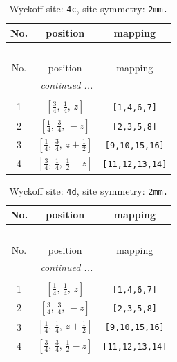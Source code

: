 \documentclass[fleqn,8pt]{jsarticle}
\begin{document}
\renewcommand{\arraystretch}{1.2}
\begin{longtable}{ccc}
\caption{Wyckoff site: {\tt 4c}, site symmetry: {\tt 2mm.}}
 \\
 \hline \hline
No. & position & mapping \\ \hline \endfirsthead

\multicolumn{2}{l}{\tablename\ \thetable{}} \\
 \hline \hline
No. & position & mapping \\ \hline \endhead

 \hline \hline
\multicolumn{2}{r}{\footnotesize\it continued ...} \\ \endfoot

 \hline \hline
\multicolumn{2}{r}{} \\ \endlastfoot

1 & $\left[ \frac{3}{4},\, \frac{1}{4},\, z \right]$ & {\tt [1,4,6,7]} \\ \hline
2 & $\left[ \frac{1}{4},\, \frac{3}{4},\, - z \right]$ & {\tt [2,3,5,8]} \\ \hline
3 & $\left[ \frac{1}{4},\, \frac{3}{4},\, z + \frac{1}{2} \right]$ & {\tt [9,10,15,16]} \\ \hline
4 & $\left[ \frac{3}{4},\, \frac{1}{4},\, \frac{1}{2} - z \right]$ & {\tt [11,12,13,14]} \\
\end{longtable}
\renewcommand{\arraystretch}{1.2}
\begin{longtable}{ccc}
\caption{Wyckoff site: {\tt 4d}, site symmetry: {\tt 2mm.}}
 \\
 \hline \hline
No. & position & mapping \\ \hline \endfirsthead

\multicolumn{2}{l}{\tablename\ \thetable{}} \\
 \hline \hline
No. & position & mapping \\ \hline \endhead

 \hline \hline
\multicolumn{2}{r}{\footnotesize\it continued ...} \\ \endfoot

 \hline \hline
\multicolumn{2}{r}{} \\ \endlastfoot

1 & $\left[ \frac{1}{4},\, \frac{1}{4},\, z \right]$ & {\tt [1,4,6,7]} \\ \hline
2 & $\left[ \frac{3}{4},\, \frac{3}{4},\, - z \right]$ & {\tt [2,3,5,8]} \\ \hline
3 & $\left[ \frac{1}{4},\, \frac{1}{4},\, z + \frac{1}{2} \right]$ & {\tt [9,10,15,16]} \\ \hline
4 & $\left[ \frac{3}{4},\, \frac{3}{4},\, \frac{1}{2} - z \right]$ & {\tt [11,12,13,14]} \\
\end{longtable}
\end{document}
